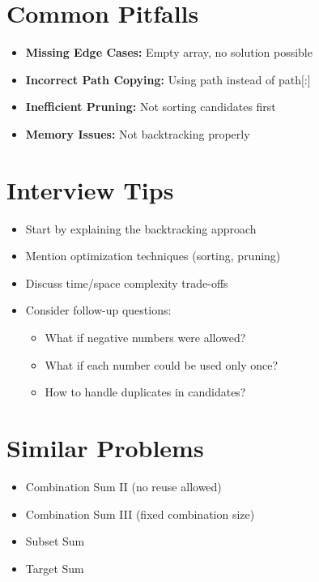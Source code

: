 \section*{Common Pitfalls}
\begin{itemize}
    \item \textbf{Missing Edge Cases:} Empty array, no solution possible
    \item \textbf{Incorrect Path Copying:} Using path instead of path[:]
    \item \textbf{Inefficient Pruning:} Not sorting candidates first
    \item \textbf{Memory Issues:} Not backtracking properly
\end{itemize}

\section*{Interview Tips}
\begin{itemize}
    \item Start by explaining the backtracking approach
    \item Mention optimization techniques (sorting, pruning)
    \item Discuss time/space complexity trade-offs
    \item Consider follow-up questions:
        \begin{itemize}
            \item What if negative numbers were allowed?
            \item What if each number could be used only once?
            \item How to handle duplicates in candidates?
        \end{itemize}
\end{itemize}

\section*{Similar Problems}
\begin{itemize}
    \item Combination Sum II (no reuse allowed)
    \item Combination Sum III (fixed combination size)
    \item Subset Sum
    \item Target Sum
\end{itemize}

